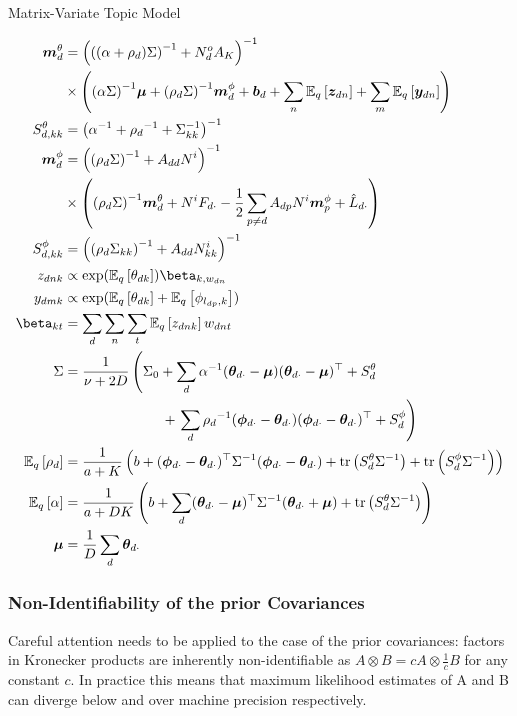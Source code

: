 \begin{algorithm}
\caption{Matrix-Variate Topic Model}
\label{alg:sra_generic}

    \begin{align*}
        \mtd &= 
            \invb{ \invb{(\alpha + \rho_d)\Sigma} + N^o_d A_K } \\
            & \times \left(
                \invb{\alpha \Sigma}\vv{\mu}
                + \invb{\rho_d \Sigma} \mpd + \vv{b}_d 
                + \sum_n \ex{\vv{z}_{dn}}{q} 
                + \sum_m \ex{\vv{y}_{dn}}{q}
            \right)\\
         S^\theta_{d,kk} &= \invb{\inv{\alpha} + \inv{\rho_d} + \inv{\Sigma}_{kk}} \\
         \mpd & = \invb{\invb{\rho_d \Sigma} + A_{dd}N^i} \\
             & \times \left(
                 \invb{\rho_d \Sigma}\mtd 
                 + N^i F_{d\cdot} 
                 -\half \sum_{p \neq d} A_{dp} N^i \vv{m}^\phi_p 
                 + \hat{L}_{d\cdot}
             \right) \\
        S^\phi_{d,kk} & = \invb{ \invb{\rho_d \Sigma_{kk}} + A_{dd}N^i_{kk} } \\
        z_{dnk} & \propto \exp(\ex{\theta_{dk}}{q})\beta_{k,w_{dn}} \\
        y_{dmk} & \propto \exp(\ex{\theta_{dk}}{q} + \ex{\phi_{l_{dp},k}}{q}) \\
        \vv{\beta}_{kt} & = \sum_d \sum_n \sum_t \ex{z_{dnk}}{q} w_{dnt} \\
        \Sigma & =  \oneover{\nu + 2D} \left(\Sigma_0
             + \sum_d \inv{\alpha} (\thdo - \vv{\mu})(\thdo - \vv{\mu})\T + \std  \right .\\
            & \qquad\qquad\qquad\quad+ \left. \sum_d \inv{\rho_d} (\phdo - \thdo)(\phdo - \thdo)\T + \spd \right)  \\  \ex{\rho_d}{q} & = \oneover{a + K} \left(b + (\phdo - \thdo)\T \inv{\Sigma} (\phdo - \thdo) + \Tr{\std \inv{\Sigma}} + \Tr{\spd \inv{\Sigma}} \right) \\
        \ex{\alpha}{q} & = \oneover{a + DK} \left(b + \sum_d (\thdo - \vv{\mu})\T\inv{\Sigma}(\thdo + \vv{\mu}) + \Tr{\std \inv{\Sigma}} \right) \\
        \vv{\mu} &= \oneover{D} \sum_d \thdo
    \end{align*}
\end{algorithm}

\subsubsection*{Non-Identifiability of the prior Covariances}
Careful attention needs to be applied to the case of the prior covariances: factors in Kronecker products are inherently non-identifiable as $A \otimes B = c A \otimes \frac{1}{c} B$ for any constant $c$. In practice this means that maximum likelihood estimates of A and B can diverge below and over machine precision respectively.

